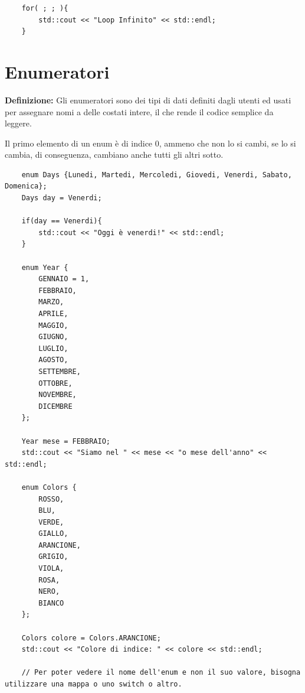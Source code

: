 \begin{lstlisting}
	for( ; ; ){
		std::cout << "Loop Infinito" << std::endl;
	}
\end{lstlisting}


\section{Enumeratori}

\textsf{\small \textbf{Definizione: } Gli enumeratori sono dei tipi di dati definiti dagli utenti ed usati per assegnare nomi a delle costati intere, il che rende il codice semplice da leggere.}

\textsf{\small Il primo elemento di un enum è di indice 0, ammeno che non lo si cambi, se lo si cambia, di conseguenza, cambiano anche tutti gli altri sotto.} \\

\begin{lstlisting}
	enum Days {Lunedi, Martedi, Mercoledi, Giovedi, Venerdi, Sabato, Domenica};
	Days day = Venerdi;
	
	if(day == Venerdi){
		std::cout << "Oggi è venerdi!" << std::endl;
	}
	
	enum Year {
		GENNAIO = 1,
		FEBBRAIO,
		MARZO,
		APRILE,
		MAGGIO,
		GIUGNO,
		LUGLIO,
		AGOSTO,
		SETTEMBRE,
		OTTOBRE,
		NOVEMBRE,
		DICEMBRE
	};

	Year mese = FEBBRAIO;
	std::cout << "Siamo nel " << mese << "o mese dell'anno" << std::endl;

	enum Colors {
		ROSSO,
		BLU,
		VERDE,
		GIALLO,
		ARANCIONE,
		GRIGIO,
		VIOLA,
		ROSA,
		NERO,
		BIANCO
	};	

	Colors colore = Colors.ARANCIONE;
	std::cout << "Colore di indice: " << colore << std::endl;
	
	// Per poter vedere il nome dell'enum e non il suo valore, bisogna utilizzare una mappa o uno switch o altro.
\end{lstlisting}




